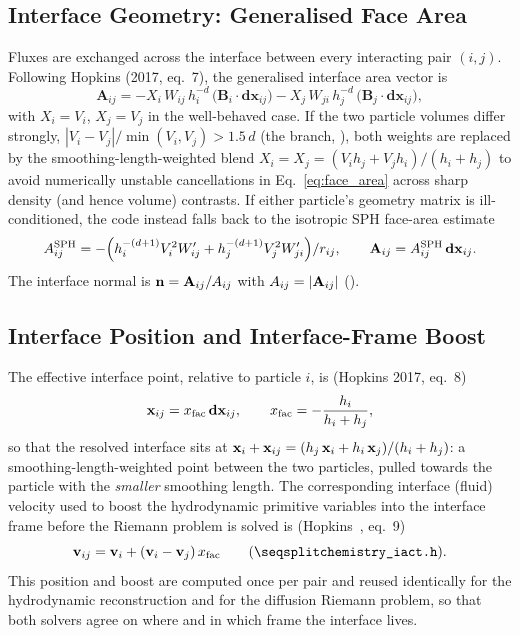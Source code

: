 \subsection{Interface Geometry: Generalised Face Area}
\label{sec:face-area}
Fluxes are exchanged across the interface between every
interacting pair $(i,j)$. Following Hopkins (2017, eq.~7), the
generalised interface area vector is
\begin{equation}
  \label{eq:face_area}
  \mathbf A_{ij} = -X_i\, W_{ij}\, h_i^{-d}\, \big(\mathbf B_i \cdot \mathbf{dx}_{ij}\big)
                   -X_j\, W_{ji}\, h_j^{-d}\, \big(\mathbf B_j \cdot \mathbf{dx}_{ij}\big) ,
\end{equation}
with $X_i = V_i$, $X_j = V_j$ in the well-behaved case. If the two
particle volumes differ strongly,
$|V_i-V_j|/\min(V_i,V_j) > 1.5\, d$ (the 
branch, ), both weights are replaced by
the smoothing-length-weighted blend
$X_i = X_j = (V_i h_j + V_j h_i)/(h_i+h_j)$
to avoid numerically unstable cancellations in
Eq.~\eqref{eq:face_area} across sharp density (and hence volume)
contrasts. If either particle's geometry matrix is ill-conditioned, the
code instead falls back to the isotropic SPH face-area estimate
\begin{equation}
  A_{ij}^{\rm SPH} = -\Big(h_i^{-(d+1)} V_i^2 W'_{ij} + h_j^{-(d+1)} V_j^2 W'_{ji}\Big)/r_{ij} ,
  \qquad \mathbf A_{ij} = A_{ij}^{\rm SPH}\, \mathbf{dx}_{ij} .
\end{equation}
The interface normal is $\mathbf{n} = \mathbf A_{ij}/A_{ij}$ with
$A_{ij} = |\mathbf A_{ij}|$
().

\subsection{Interface Position and Interface-Frame Boost}
\label{sec:interface-position}
The effective interface point, relative to particle $i$, is (Hopkins
2017, eq.~8)
\begin{equation}
  \label{eq:interface_position}
  \mathbf{x}_{ij} = x_{\rm fac}\, \mathbf{dx}_{ij} , \qquad
  x_{\rm fac} = -\frac{h_i}{h_i+h_j} ,
\end{equation}
so that the resolved interface sits at
$\mathbf x_i + \mathbf{x}_{ij} = (h_j\, \mathbf x_i + h_i\, \mathbf x_j)/(h_i+h_j)$:
a smoothing-length-weighted point between the two particles, pulled
towards the particle with the \emph{smaller} smoothing length. The corresponding interface (fluid) velocity used to
boost the hydrodynamic primitive variables into the interface frame
before the Riemann problem is solved is (Hopkins~\citeyear{Hopkins2017diffusion}, eq.~9)
\begin{equation}
  \mathbf v_{ij} = \mathbf v_i + (\mathbf v_i - \mathbf v_j)\, x_{\rm fac}
  \qquad \text{(\code{chemistry\_iact.h})} .
\end{equation}
This position and boost are computed once per pair and reused
identically for the hydrodynamic reconstruction and for the diffusion
Riemann problem, so that both solvers agree on where and in which frame
the interface lives.

